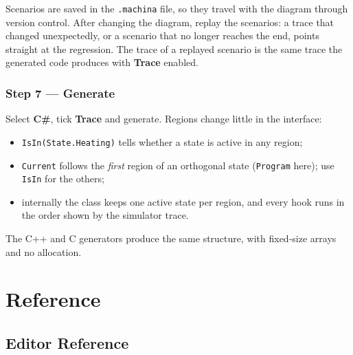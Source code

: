 \documentclass[11pt,a4paper,openany]{report}
\newcommand{\ui}[1]{\textsf{\textbf{#1}}}
\newcommand{\code}[1]{\texttt{#1}}
\begin{document}
\begin{tip}
Scenarios are saved in the \code{.machina} file, so they travel with the diagram through version
control. After changing the diagram, replay the scenarios: a trace that changed unexpectedly, or a
scenario that no longer reaches the end, points straight at the regression. The trace of a replayed
scenario is the same trace the generated code produces with \ui{Trace} enabled.
\end{tip}

\section{Step 7 --- Generate}
Select \ui{C\#}, tick \ui{Trace} and generate. Regions change little in the interface:
\begin{itemize}[itemsep=1pt]
  \item \code{IsIn(State.Heating)} tells whether a state is active in any region;
  \item \code{Current} follows the \emph{first} region of an orthogonal state (\code{Program} here);
        use \code{IsIn} for the others;
  \item internally the class keeps one active state per region, and every hook runs in the order shown
        by the simulator trace.
\end{itemize}
The C++ and C generators produce the same structure, with fixed-size arrays and no allocation.

\part{Reference}

\chapter{Editor Reference}
\label{ch:editor}
\end{document}
